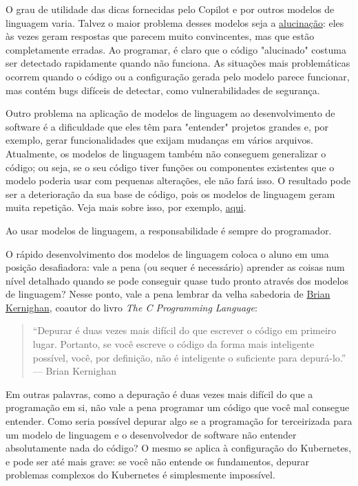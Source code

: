 \documentclass[11pt,a4paper]{article}
\begin{document}
O grau de utilidade das dicas fornecidas pelo Copilot e por outros modelos de linguagem varia. Talvez o maior problema desses modelos seja a \href{https://en.wikipedia.org/wiki/Hallucination_(artificial_intelligence)}{alucinação}: eles às vezes geram respostas que parecem muito convincentes, mas que estão completamente erradas. Ao programar, é claro que o código "alucinado" costuma ser detectado rapidamente quando não funciona. As situações mais problemáticas ocorrem quando o código ou a configuração gerada pelo modelo parece funcionar, mas contém bugs difíceis de detectar, como vulnerabilidades de segurança.

Outro problema na aplicação de modelos de linguagem ao desenvolvimento de software é a dificuldade que eles têm para "entender" projetos grandes e, por exemplo, gerar funcionalidades que exijam mudanças em vários arquivos. Atualmente, os modelos de linguagem também não conseguem generalizar o código; ou seja, se o seu código tiver funções ou componentes existentes que o modelo poderia usar com pequenas alterações, ele não fará isso. O resultado pode ser a deterioração da sua base de código, pois os modelos de linguagem geram muita repetição. Veja mais sobre isso, por exemplo, \href{https://visualstudiomagazine.com/articles/2024/01/25/copilot-research.aspx}{aqui}.

Ao usar modelos de linguagem, a responsabilidade é sempre do programador.

O rápido desenvolvimento dos modelos de linguagem coloca o aluno em uma posição desafiadora: vale a pena (ou sequer é necessário) aprender as coisas num nível detalhado quando se pode conseguir quase tudo pronto através dos modelos de linguagem? Nesse ponto, vale a pena lembrar da velha sabedoria de \href{https://en.wikipedia.org/wiki/Brian_Kernighan}{Brian Kernighan}, coautor do livro \textit{The C Programming Language}:

\begin{quote}
``Depurar é duas vezes mais difícil do que escrever o código em primeiro lugar. Portanto, se você escreve o código da forma mais inteligente possível, você, por definição, não é inteligente o suficiente para depurá-lo.'' --- Brian Kernighan
\end{quote}

Em outras palavras, como a depuração é duas vezes mais difícil do que a programação em si, não vale a pena programar um código que você mal consegue entender. Como seria possível depurar algo se a programação for terceirizada para um modelo de linguagem e o desenvolvedor de software não entender absolutamente nada do código? O mesmo se aplica à configuração do Kubernetes, e pode ser até mais grave: se você não entende os fundamentos, depurar problemas complexos do Kubernetes é simplesmente impossível.
\end{document}
